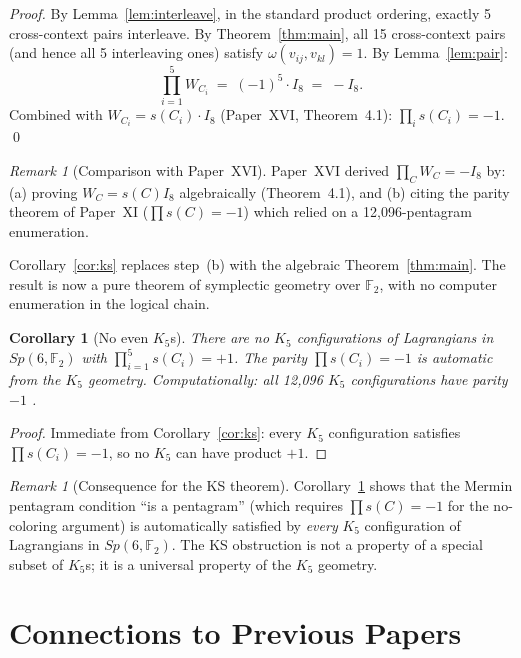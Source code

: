 \documentclass[11pt,a4paper]{article}
\newtheorem{corollary}[theorem]{Corollary}
\theoremstyle{remark}
\newtheorem{remark}[theorem]{Remark}
\begin{document}
\begin{proof}
By Lemma~\ref{lem:interleave}, in the standard product ordering,
exactly 5 cross-context pairs interleave.
By Theorem~\ref{thm:main}, all 15 cross-context pairs (and hence
all 5 interleaving ones) satisfy $\omega(v_{ij},v_{kl}) = 1$.
By Lemma~\ref{lem:pair}:
\[
  \prod_{i=1}^5 W_{C_i}
  \;=\; (-1)^5 \cdot I_8
  \;=\; -I_8.
\]
Combined with $W_{C_i} = s(C_i) \cdot I_8$ (Paper~XVI, Theorem~4.1):
$\prod_i s(C_i) = -1$. \qed
\end{proof}

\begin{remark}[Comparison with Paper~XVI]
Paper~XVI derived $\prod_C W_C = -I_8$ by:
(a) proving $W_C = s(C) I_8$ algebraically (Theorem~4.1), and
(b) citing the parity theorem of Paper~XI ($\prod s(C) = -1$)
    which relied on a 12{,}096-pentagram enumeration.

Corollary~\ref{cor:ks} replaces step~(b) with the algebraic
Theorem~\ref{thm:main}.
The result is now a pure theorem of symplectic geometry over $\mathbb{F}_2$,
with no computer enumeration in the logical chain.
\end{remark}

\begin{corollary}[No even $K_5$s]\label{cor:noeven}
There are no $K_5$ configurations of Lagrangians in $Sp(6, \mathbb{F}_2)$
with $\prod_{i=1}^5 s(C_i) = +1$.
The parity $\prod s(C_i) = -1$ is \emph{automatic} from the $K_5$ geometry.
Computationally: all 12{,}096 $K_5$ configurations have parity $-1$
\cite{PaperXVIIsuppl}.
\end{corollary}

\begin{proof}
Immediate from Corollary~\ref{cor:ks}: every $K_5$ configuration
satisfies $\prod s(C_i) = -1$, so no $K_5$ can have product $+1$.
\end{proof}

\begin{remark}[Consequence for the KS theorem]
Corollary~\ref{cor:noeven} shows that the Mermin pentagram condition
``is a pentagram'' (which requires $\prod s(C) = -1$ for the
no-coloring argument) is automatically satisfied by \emph{every}
$K_5$ configuration of Lagrangians in $Sp(6,\mathbb{F}_2)$.
The KS obstruction is not a property of a special subset of $K_5$s;
it is a universal property of the $K_5$ geometry.
\end{remark}


\section{Connections to Previous Papers}\label{sec:connections}
\end{document}
